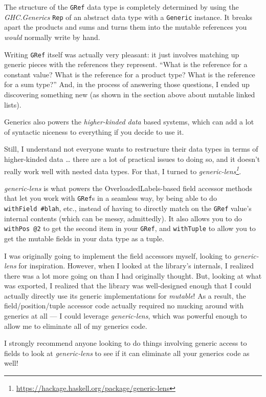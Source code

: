 \documentclass[]{article}
\renewcommand{\href}[2]{#2\footnote{\url{#1}}}
\begin{document}
The structure of the \texttt{GRef} data type is completely determined by using
the \emph{GHC.Generics} \texttt{Rep} of an abstract data type with a
\texttt{Generic} instance. It breaks apart the products and sums and turns them
into the mutable references you \emph{would} normally write by hand.

Writing \texttt{GRef} itself was actually very pleasant: it just involves
matching up generic pieces with the references they represent. ``What is the
reference for a constant value? What is the reference for a product type? What
is the reference for a sum type?'' And, in the process of answering those
questions, I ended up discovering something new (as shown in the section above
about mutable linked lists).

Generics also powers the \emph{higher-kinded data} based systems, which can add
a lot of syntactic niceness to everything if you decide to use it.

Still, I understand not everyone wants to restructure their data types in terms
of higher-kinded data \ldots{} there are a lot of practical issues to doing so,
and it doesn't really work well with nested data types. For that, I turned to
\emph{\href{https://hackage.haskell.org/package/generic-lens}{generic-lens}}.

\emph{generic-lens} is what powers the OverloadedLabels-based field accessor
methods that let you work with \texttt{GRef}s in a seamless way, by being able
to do \texttt{withField\ \#blah}, etc., instead of having to directly match on
the \texttt{GRef} value's internal contents (which can be messy, admittedly). It
also allows you to do \texttt{withPos\ @2} to get the second item in your
\texttt{GRef}, and \texttt{withTuple} to allow you to get the mutable fields in
your data type as a tuple.

I was originally going to implement the field accessors myself, looking to
\emph{generic-lens} for inspiration. However, when I looked at the library's
internals, I realized there was a lot more going on than I had originally
thought. But, looking at what was exported, I realized that the library was
well-designed enough that I could actually directly use its generic
implementations for \emph{mutable}! As a result, the field/position/tuple
accessor code actually required no mucking around with generics at all --- I
could leverage \emph{generic-lens}, which was powerful enough to allow me to
eliminate all of my generics code.

I strongly recommend anyone looking to do things involving generic access to
fields to look at \emph{generic-lens} to see if it can eliminate all your
generics code as well!
\end{document}
